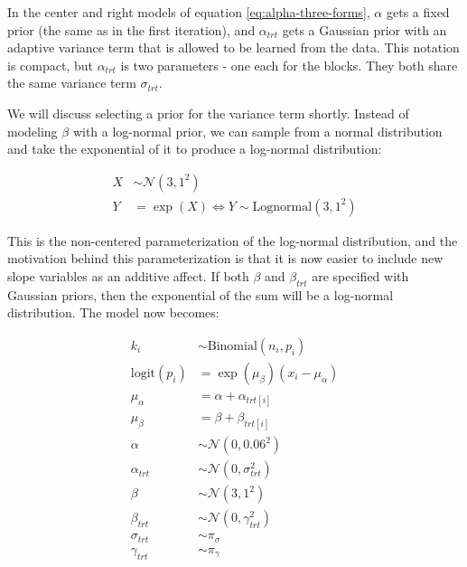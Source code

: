 \documentclass[11pt, oneside, openany]{scrbook}
\begin{document}
In the center and right models of equation \eqref{eq:alpha-three-forms}, \(\alpha\) gets a fixed prior (the same as in the first iteration), and \(\alpha_{trt}\) gets a Gaussian prior with an adaptive variance term that is allowed to be learned from the data. This notation is compact, but \(\alpha_{trt}\) is two parameters - one each for the blocks. They both share the same variance term \(\sigma_{trt}\).

We will discuss selecting a prior for the variance term shortly. Instead of modeling \(\beta\) with a log-normal prior, we can sample from a normal distribution and take the exponential of it to produce a log-normal distribution:


\begin{align*}
X &\sim \mathcal{N}(3, 1^2) \\
Y &= \exp\left(X\right) \Longleftrightarrow Y \sim \mathrm{Lognormal(3, 1^2)}
\end{align*}

This is the non-centered parameterization of the log-normal distribution, and the motivation behind this parameterization is that it is now easier to include new slope variables as an additive affect. If both \(\beta\) and \(\beta_{trt}\) are specified with Gaussian priors, then the exponential of the sum will be a log-normal distribution. The model now becomes:


\begin{equation}
\begin{split}
k_i &\sim \mathrm{Binomial}(n_i, p_i) \\
\mathrm{logit}(p_i) &= \exp(\mu_\beta) (x_i - \mu_\alpha) \\
\mu_\alpha &= \alpha + \alpha_{trt[i]} \\
\mu_\beta &= \beta + \beta_{trt[i]} \\
\alpha &\sim \mathcal{N}(0, 0.06^2) \\
\alpha_{trt} &\sim \mathcal{N}(0, \sigma_{trt}^2) \\
\beta &\sim \mathcal{N}(3, 1^2) \\
\beta_{trt} &\sim \mathcal{N}(0, \gamma_{trt}^2) \\
\sigma_{trt} &\sim \pi_{\sigma} \\
\gamma_{trt} &\sim \pi_{\gamma}
\end{split}
\label{eq:iter2-partial-model}
\end{equation}
\end{document}
